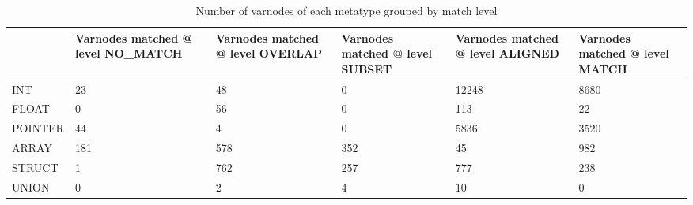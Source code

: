 \begin{table}[t]
\centering
\caption{Number of varnodes of each metatype grouped by match level}
\label{table:metatype-match-levels}
\begin{tabular}{lp{3.6cm}p{3.6cm}p{3.6cm}p{3.6cm}p{3.6cm}}
\toprule
{} &  Varnodes matched @ level NO\_MATCH &  Varnodes matched @ level OVERLAP &  Varnodes matched @ level SUBSET &  Varnodes matched @ level ALIGNED &  Varnodes matched @ level MATCH \\
\midrule
INT     &                                 23 &                                48 &                                0 &                             12248 &                            8680 \\
FLOAT   &                                  0 &                                56 &                                0 &                               113 &                              22 \\
POINTER &                                 44 &                                 4 &                                0 &                              5836 &                            3520 \\
ARRAY   &                                181 &                               578 &                              352 &                                45 &                             982 \\
STRUCT  &                                  1 &                               762 &                              257 &                               777 &                             238 \\
UNION   &                                  0 &                                 2 &                                4 &                                10 &                               0 \\
\bottomrule
\end{tabular}
\end{table}

